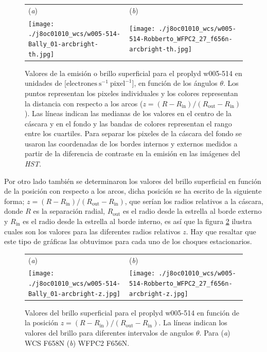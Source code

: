 \begin{figure}[htp]
\centering
\begin{tabular}{l l}
(\textit{a}) & (\textit{b})  \\
  \texttt{[image: ./j8oc01010\_wcs/w005-514-Bally\_01-arcbright-th.jpg]}
& \texttt{[image: ./j8oc01010\_wcs/w005-514-Robberto\_WFPC2\_27\_f656n-arcbright-th.jpg]}\\
\end{tabular}
\caption{Valores de la emisión o brillo superficial para el proplyd w005-514 en unidades de [\(\text{electrones}~\text{s}^{-1}~\text{pixel}^{-1}\)], en función de los ángulos \(\theta\). Los puntos representan los pixeles individuales y los colores representan la distancia con respecto a los arcos (\(z = (R - R_{\text{in}})/(R_{\text{out}} - R_{\text{in}})\)). Las líneas indican las medianas de los valores en el centro de la cáscara y en el fondo y las bandas de colores representan el rango entre los cuartiles. Para separar los pixeles de la cáscara del fondo se usaron las coordenadas de los bordes internos y externos medidos a partir de la diferencia de contraste en la emisión en las imágenes del \textit{HST}.}\label{fig:brillo-theta}
\end{figure}


Por otro lado también se determinaron los valores del brillo superficial en función de la posición con respecto a los arcos, dicha posición se ha escrito de la siguiente forma; \(z = (R - R_{\text{in}})/(R_{\text{out}} - R_{\text{in}})\), que serían los radios relativos a la cáscara, donde \(R\) es la separación radial, \(R_{\text{out}}\) es el radio  desde la estrella al borde externo y \(R_{\text{in}}\) es el radio desde  la estrella al borde interno, es así que la figura \ref{fig:brillo-z} ilustra cuales son los valores para las diferentes radios relativos \(z\). Hay que resaltar que este tipo de gráficas las obtuvimos para cada uno de los choques estacionarios.\\
\begin{figure}[htp]
\centering
\begin{tabular}{l l}
(\textit{a}) & (\textit{b})  \\
  \texttt{[image: ./j8oc01010\_wcs/w005-514-Bally\_01-arcbright-z.jpg]}
& \texttt{[image: ./j8oc01010\_wcs/w005-514-Robberto\_WFPC2\_27\_f656n-arcbright-z.jpg]}\\
\end{tabular}
\caption{Valores del brillo superficial para el proplyd w005-514 en función de la posición  \(z = (R - R_{\text{in}})/(R_{\text{out}} - R_{\text{in}})\). La líneas indican los valores del brillo para diferentes intervalos de angulos \(\theta\).  Para (\textit{a}) WCS F658N (\textit{b}) WFPC2 F656N.}\label{fig:brillo-z}
\end{figure}

